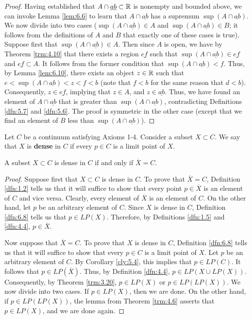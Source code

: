 \documentclass[../main.tex]{subfiles}
\begin{document}
\begin{exercise}
\begin{proof}
        Having established that $A\cap\underline{ab}\subset\mathbb{R}$ is nonempty and bounded above, we can invoke Lemma \ref{lem:6.6} to learn that $A\cap\underline{ab}$ has a supremum $\sup(A\cap\underline{ab})$. We now divide into two cases ($\sup(A\cap\underline{ab})\in A$ and $\sup(A\cap\underline{ab})\in B$; it follows from the definitions of $A$ and $B$ that exactly one of these cases is true). Suppose first that $\sup(A\cap\underline{ab})\in A$. Then since $A$ is open, we have by Theorem \ref{trm:4.10} that there exists a region $\underline{ef}$ such that $\sup(A\cap\underline{ab})\in\underline{ef}$ and $\underline{ef}\subset A$. It follows from the former condition that $\sup(A\cap\underline{ab})<f$. Thus, by Lemma \ref{lem:6.10}, there exists an object $z\in\mathbb{R}$ such that $e<\sup(A\cap\underline{ab})<z<f<b$ (note that $f<b$ for the same reason that $d<b$). Consequently, $z\in\underline{ef}$, implying that $z\in A$, and $z\in\underline{ab}$. Thus, we have found an element of $A\cap\underline{ab}$ that is greater than $\sup(A\cap\underline{ab})$, contradicting Definitions \ref{dfn:5.7} and \ref{dfn:5.6}. The proof is symmetric in the other case (except that we find an element of $B$ less than $\sup(A\cap\underline{ab})$).
    \end{proof}
\end{exercise}

\begin{definition}\label{dfn:6.8}
    Let $C$ be a continuum satisfying Axioms 1-4. Consider a subset $X\subset C$. We say that $X$ is \textbf{dense} in $C$ if every $p\in C$ is a limit point of $X$.
\end{definition}

\begin{lemma}\label{lem:6.9}
    A subset $X\subset C$ is dense in $C$ if and only if $\overline{X}=C$.
    \begin{proof}
        Suppose first that $X\subset C$ is dense in $C$. To prove that $\overline{X}=C$, Definition \ref{dfn:1.2} tells us that it will suffice to show that every point $p\in\overline{X}$ is an element of $C$ and vice versa. Clearly, every element of $\overline{X}$ is an element of $C$. On the other hand, let $p$ be an arbitrary element of $C$. Since $X$ is dense in $C$, Definition \ref{dfn:6.8} tells us that $p\in LP(X)$. Therefore, by Definitions \ref{dfn:1.5} and \ref{dfn:4.4}, $p\in\overline{X}$.\par
        Now suppose that $\overline{X}=C$. To prove that $X$ is dense in $C$, Definition \ref{dfn:6.8} tells us that it will suffice to show that every $p\in C$ is a limit point of $X$. Let $p$ be an arbitrary element of $C$. By Corollary \ref{cly:5.4}, this implies that $p\in LP(C)$. It follows that $p\in LP(\overline{X})$. Thus, by Definition \ref{dfn:4.4}, $p\in LP(X\cup LP(X))$. Consequently, by Theorem \ref{trm:3.20}, $p\in LP(X)$ or $p\in LP(LP(X))$. We now divide into two cases. If $p\in LP(X)$, then we are done. On the other hand, if $p\in LP(LP(X))$, the lemma from Theorem \ref{trm:4.6} asserts that $p\in LP(X)$, and we are done again.
    \end{proof}
\end{lemma}
\end{document}
